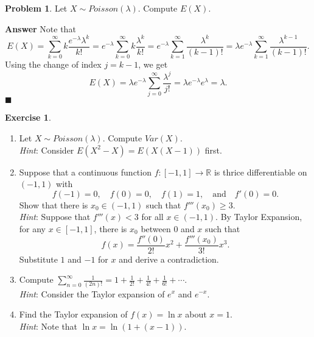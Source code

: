 \documentclass[12pt,letterpaper]{book}
\numberwithin{equation}{section}
\theoremstyle{definition}
\newtheorem{problem}[thm]{\textbf{Problem}}
\newtheorem{exercise}{\textbf{Exercise}}[chapter]
\newenvironment{answer}{\noindent\textbf{Answer}}{\hfill$\blacksquare$\vspace{0.1in}}
\begin{document}
\begin{problem}
Let $X\sim Poisson(\lambda)$. Compute $E(X)$.
\end{problem}

\begin{answer} Note that
$$E(X)=\sum_{k=0}^\infty k\frac{e^{-\lambda}\lambda^k}{k!}=e^{-\lambda}\sum_{k=0}^\infty k\frac{\lambda^k}{k!}=e^{-\lambda}\sum_{k=1}^\infty \frac{\lambda^k}{(k-1)!}=\lambda e^{-\lambda}\sum_{k=1}^\infty \frac{\lambda^{k-1}}{(k-1)!}.$$
Using the change of index $j=k-1$, we get
$$E(X)=\lambda e^{-\lambda}\sum_{j=0}^\infty \frac{\lambda^{j}}{j!}=\lambda e^{-\lambda}e^\lambda=\lambda.$$
\end{answer}


\begin{exercise}\quad
\begin{enumerate}[\bfseries 1.]
\item Let $X\sim Poisson(\lambda)$. Compute $Var(X)$.\\
\textit{Hint}: Consider $E(X^2-X)=E(X(X-1))$ first.

\item Suppose that a continuous function $f:[-1,1]\to \mathbb{R}$ is thrice differentiable on $(-1,1)$ with
$$ f(-1)=0,\quad f(0)=0,\quad f(1)=1,\quad\text{and}\quad f'(0)=0.$$
Show that there is $x_0\in (-1,1)$ such that $f'''(x_0)\geq 3$.\\
\textit{Hint}: Suppose that $f'''(x)<3$ for all $x\in (-1,1)$. By Taylor Expansion, for any $x\in [-1,1]$, there is $x_0$ between $0$ and $x$ such that
$$f(x)=\frac{f''(0)}{2!}x^2+\frac{f'''(x_0)}{3!}x^3.$$ Substitute $1$ and $-1$ for $x$ and derive a contradiction.

\item Compute $\displaystyle{\sum_{n=0}^\infty \frac{1}{(2n)!}=1+\frac{1}{2!}+\frac{1}{4!}+\frac{1}{6!}+\cdots}$. \\
\textit{Hint}: Consider the Taylor expansion of $e^x$ and $e^{-x}$.

\item Find the Taylor expansion of $f(x)=\ln x$ about $x=1$.\\
\textit{Hint}: Note that $\ln x=\ln (1+(x-1))$.
\end{enumerate}
\end{exercise}
\end{document}
